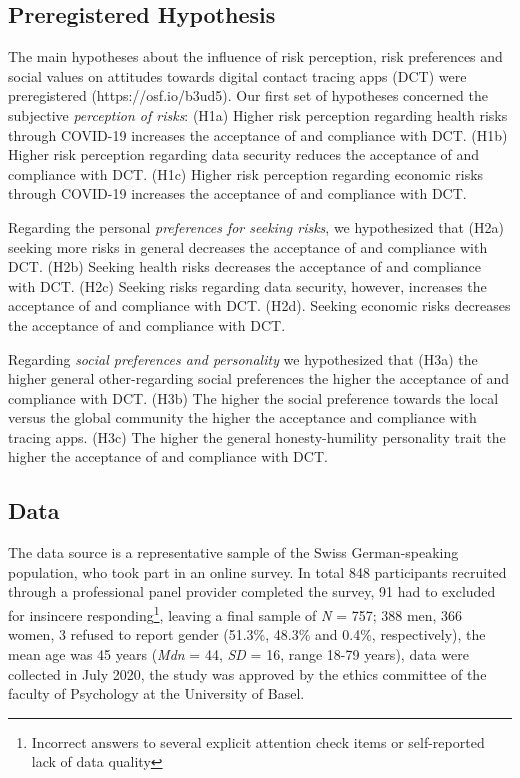 \documentclass[12pt]{article}
\begin{document}
\subsection*{Preregistered Hypothesis}
The main hypotheses about the influence of risk perception, risk preferences and social values on attitudes towards digital contact tracing apps (DCT) were preregistered (https://osf.io/b3ud5). Our first set of hypotheses concerned the subjective \textit{perception of risks}: (H1a) Higher risk perception regarding health risks through COVID-19 increases the acceptance of and compliance with DCT. (H1b) Higher risk perception regarding data security reduces the acceptance of and compliance with DCT. (H1c) Higher risk perception regarding economic risks through COVID-19 increases the acceptance of and compliance with DCT.

Regarding the personal \textit{preferences for seeking risks}, we hypothesized that (H2a) seeking more risks in general decreases the acceptance of and compliance with DCT. (H2b) Seeking health risks decreases the acceptance of and compliance with DCT. (H2c) Seeking risks regarding data security, however, increases the acceptance of and compliance with DCT. (H2d). Seeking economic risks decreases the acceptance of and compliance with DCT.

Regarding \textit{social preferences and personality} we hypothesized that (H3a) the higher general other-regarding social preferences the higher the acceptance of and compliance with DCT. (H3b) The higher the social preference towards the local versus the global community the higher the acceptance and compliance with tracing apps. (H3c) The higher the general honesty-humility personality trait the higher the acceptance of and compliance with DCT.


\subsection*{Data}
The data source is a representative sample of the Swiss German-speaking population, who took part in an online survey. In total 848 participants recruited through a professional panel provider completed the survey, 91 had to excluded for insincere responding\footnote{Incorrect answers to several explicit attention check items or self-reported lack of data quality}, leaving a final sample of \textit{N} = 757; 388 men, 366 women, 3 refused to report gender (51.3\%, 48.3\% and 0.4\%, respectively), the mean age was 45 years (\textit{Mdn} = 44, \textit{SD} = 16, range 18-79 years), data were collected in July 2020, the study was approved by the ethics committee of the faculty of Psychology at the University of Basel.
\end{document}
